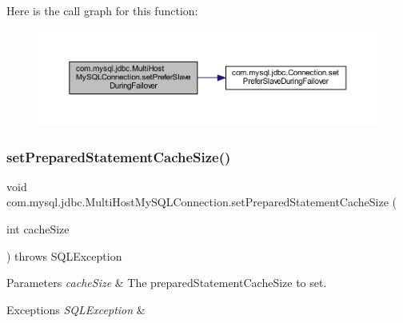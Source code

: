 Here is the call graph for this function\+:
\nopagebreak
\begin{figure}[H]
\begin{center}
\leavevmode
\includegraphics[width=350pt]{classcom_1_1mysql_1_1jdbc_1_1_multi_host_my_s_q_l_connection_a87204976d451f0fa0c086fea3bc3be73_cgraph}
\end{center}
\end{figure}
\mbox{\label{classcom_1_1mysql_1_1jdbc_1_1_multi_host_my_s_q_l_connection_a05873fd9b3404787c16dd6ae3793d84e}} 
\subsubsection{\texorpdfstring{set\+Prepared\+Statement\+Cache\+Size()}{setPreparedStatementCacheSize()}}
{\footnotesize\ttfamily void com.\+mysql.\+jdbc.\+Multi\+Host\+My\+S\+Q\+L\+Connection.\+set\+Prepared\+Statement\+Cache\+Size (\begin{DoxyParamCaption}\item[{int}]{cache\+Size }\end{DoxyParamCaption}) throws S\+Q\+L\+Exception}


\begin{DoxyParams}{Parameters}
{\em cache\+Size} & The prepared\+Statement\+Cache\+Size to set. \\
\hline
\end{DoxyParams}

\begin{DoxyExceptions}{Exceptions}
{\em S\+Q\+L\+Exception} & \\
\hline
\end{DoxyExceptions}


